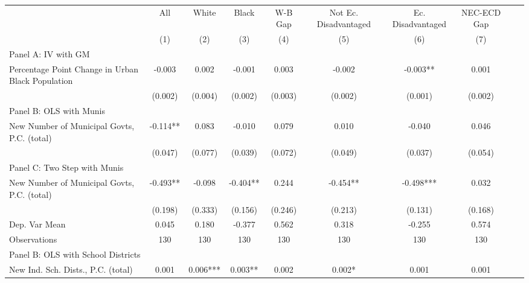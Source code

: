  \begin{tabular}{l*{9}{c}} \toprule
&\multicolumn{1}{c}{All}&\multicolumn{1}{c}{White}&\multicolumn{1}{c}{Black}&\multicolumn{1}{c}{W-B Gap}&\multicolumn{1}{c}{Not Ec. Disadvantaged}&\multicolumn{1}{c}{Ec. Disadvantaged}&\multicolumn{1}{c}{NEC-ECD Gap}&\\\cmidrule(lr){2-2}\cmidrule(lr){3-3}\cmidrule(lr){4-4}\cmidrule(lr){5-5}\cmidrule(lr){6-6}\cmidrule(lr){7-7}\cmidrule(lr){8-8}
&\multicolumn{1}{c}{(1)}&\multicolumn{1}{c}{(2)}&\multicolumn{1}{c}{(3)}&\multicolumn{1}{c}{(4)}&\multicolumn{1}{c}{(5)}&\multicolumn{1}{c}{(6)}&\multicolumn{1}{c}{(7)}\\
\cmidrule(lr){1-8}
\multicolumn{7}{l}{Panel A: IV with GM}\\
\cmidrule(lr){1-8}
Percentage Point Change in Urban Black Population&   -0.003   &    0.002   &   -0.001   &    0.003   &   -0.002   &   -0.003** &    0.001   \\
                &  (0.002)   &  (0.004)   &  (0.002)   &  (0.003)   &  (0.002)   &  (0.001)   &  (0.002)   \\
\cmidrule(lr){1-8}
\multicolumn{7}{l}{Panel B: OLS with Munis}\\
\cmidrule(lr){1-8}
New Number of Municipal Govts, P.C. (total)&   -0.114** &    0.083   &   -0.010   &    0.079   &    0.010   &   -0.040   &    0.046   \\
                &  (0.047)   &  (0.077)   &  (0.039)   &  (0.072)   &  (0.049)   &  (0.037)   &  (0.054)   \\
\cmidrule(lr){1-8}
\multicolumn{7}{l}{Panel C: Two Step with Munis}\\
\cmidrule(lr){1-8}
New Number of Municipal Govts, P.C. (total)&   -0.493** &   -0.098   &   -0.404** &    0.244   &   -0.454** &   -0.498***&    0.032   \\
                &  (0.198)   &  (0.333)   &  (0.156)   &  (0.246)   &  (0.213)   &  (0.131)   &  (0.168)   \\
\midrule
Dep. Var Mean   &    0.045   &    0.180   &   -0.377   &    0.562   &    0.318   &   -0.255   &    0.574   \\
Observations    &      130   &      130   &      130   &      130   &      130   &      130   &      130   \\
\cmidrule(lr){1-8}
\multicolumn{7}{l}{Panel B: OLS with School Districts}\\
\cmidrule(lr){1-8}
New Ind. Sch. Dists., P.C. (total)&    0.001   &    0.006***&    0.003** &    0.002   &    0.002*  &    0.001   &    0.001   \\

\end{tabular}
